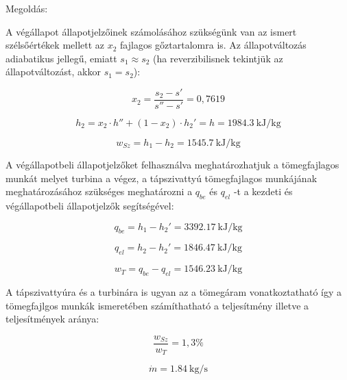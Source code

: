 	\noindent Megoldás:
	\vspace{2mm}

	\noindent A végállapot állapotjelzőinek számolásához szükségünk van az ismert szélsőértékek mellett az $x_2$ fajlagos gőztartalomra is. Az állapotváltozás adiabatikus jellegű, emiatt $s_1 \approx s_2$ (ha reverzibilisnek tekintjük az állapotváltozást, akkor $s_1 = s_2$):

	\begin{equation*}
	x_2 = \frac{s_2-s'}{s''-s'} =0,7619
	\end{equation*}
 

 
	\begin{equation*}
	h_2=x_2\cdot h''+(1-x_2)\cdot h_2'=h = \SI{1984,3}{\kilo\joule\per\kilogram}
	\end{equation*}



	\begin{equation*}
	w_{Sz}=h_1-h_2=\SI{1545,7}{\kilo\joule\per\kilogram}
	\end{equation*}

	 \noindent A végállapotbeli állapotjelzőket felhasználva  meghatározhatjuk a tömegfajlagos munkát melyet  turbina a végez, a tápszivattyú  tömegfajlagos munkájának meghatározásához   szükséges meghatározni a $q_{be}$ és $q_{el}$ -t a kezdeti és végállapotbeli állapotjelzők segítségével:
 
	\begin{equation*}
	q_{be}=h_1-h_2'=\SI{3392,17}{\kilo\joule\per\kilogram}
	\end{equation*}

	\begin{equation*}
	q_{el}=h_2-h_2'=\SI{1846,47}{\kilo\joule\per\kilogram}
	\end{equation*}

	\begin{equation*}
	w_{T}=q_{be}-q_{el}=\SI{1546,23}{\kilo\joule\per\kilogram}
	\end{equation*}

	\noindent A tápszivattyúra és a turbinára is ugyan az a  tömegáram vonatkoztatható így a tömegfajlgos munkák ismeretében számíthatható a teljesítmény illetve a teljesítmények aránya:

	\begin{equation*}
	\frac{w_{Sz}}{w_{T}}=1,3 \%
	\end{equation*}

	\begin{equation*}
	\dot{m}= \SI{1,84}{\kilogram\per\second}
	\end{equation*}

